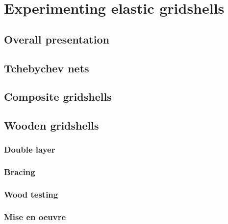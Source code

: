 
\chapter{Experimenting elastic gridshells}

\section{Overall presentation}

\section{Tchebychev nets}

\section{Composite gridshells}

\section{Wooden gridshells}
	\subsection{Double layer}
	\subsection{Bracing}
	\subsection{Wood testing}
	\subsection{Mise en oeuvre}

